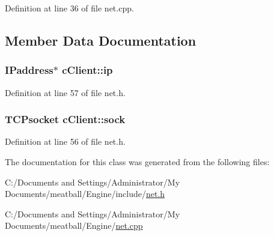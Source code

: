 Definition at line 36 of file net.\-cpp.



\subsection{Member Data Documentation}
\hypertarget{classc_client_ad1240b8a24e3339b48f07bd4de556336}{
\subsubsection[{ip}]{\setlength{\rightskip}{0pt plus 5cm}I\-Paddress$\ast$ c\-Client\-::ip}}\label{classc_client_ad1240b8a24e3339b48f07bd4de556336}


Definition at line 57 of file net.\-h.

\hypertarget{classc_client_ada06233a81c09623a3ebb76897b1d3a9}{
\subsubsection[{sock}]{\setlength{\rightskip}{0pt plus 5cm}T\-C\-Psocket c\-Client\-::sock}}\label{classc_client_ada06233a81c09623a3ebb76897b1d3a9}


Definition at line 56 of file net.\-h.



The documentation for this class was generated from the following files\-:\begin{DoxyCompactItemize}
\item 
C\-:/\-Documents and Settings/\-Administrator/\-My Documents/meatball/\-Engine/include/\hyperlink{net_8h}{net.\-h}\item 
C\-:/\-Documents and Settings/\-Administrator/\-My Documents/meatball/\-Engine/\hyperlink{net_8cpp}{net.\-cpp}\end{DoxyCompactItemize}
